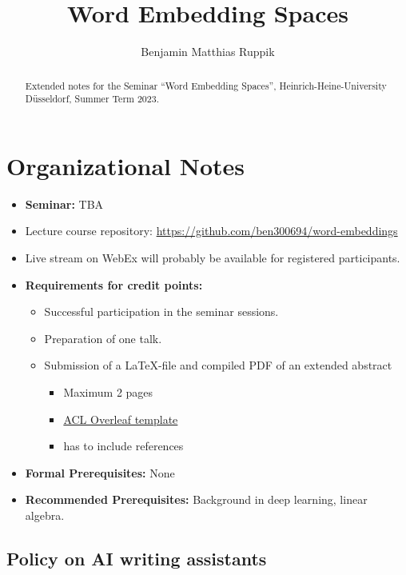 \documentclass[11pt, a4paper]{amsart}
\title{Word Embedding Spaces}
\author{Benjamin Matthias Ruppik}
\begin{document}
\begin{abstract}
    Extended notes for the Seminar ``Word Embedding Spaces'', Heinrich-Heine-University D{\"u}sseldorf, Summer Term 2023.
\end{abstract}

\maketitle

\section*{Organizational Notes}

\begin{itemize}
    \item \textbf{Seminar:} TBA
    \item Lecture course repository: \url{https://github.com/ben300694/word-embeddings}
    \item Live stream on WebEx will probably be available for registered participants.
    \item \textbf{Requirements for credit points:}
    \begin{itemize}
        \item Successful participation in the seminar sessions.
        \item Preparation of one talk.
        \item Submission of a  \LaTeX-file and compiled PDF of an extended abstract
        \begin{itemize}
        	\item Maximum 2 pages
        	\item \href{https://www.overleaf.com/latex/templates/acl-2020-proceedings-template/zsrkcwjptpcd}{ACL Overleaf template}
        	\item has to include references
        \end{itemize}
    \end{itemize}
    \item \textbf{Formal Prerequisites:} None
    \item \textbf{Recommended Prerequisites:}
    Background in deep learning,
    linear algebra.
\end{itemize}

\subsection*{Policy on AI writing assistants}
\end{document}
